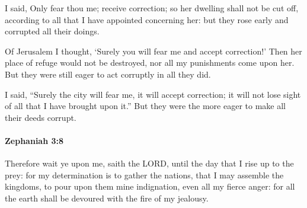 			\begin{versebox}
					\item[BHS] 
					\item[LXX] 
					\item[ASV] I said, Only fear thou me; receive correction; so her dwelling shall not be cut off, according to all that I have appointed concerning her: but they rose early and corrupted all their doings.
					\item[NIV] Of Jerusalem I thought, ‘Surely you will fear me and accept correction!’ Then her place of refuge would not be destroyed, nor all my punishments come upon her. But they were still eager to act corruptly in all they did.
					\item[NRSV] I said, “Surely the city will fear me, it will accept correction; it will not lose sight of all that I have brought upon it.” But they were the more eager to make all their deeds corrupt.
			\end{versebox}

		\paragraph{Zephaniah 3:8} %
			\label{ZEPHANIAH-3-8}

			Therefore wait ye upon me, saith the LORD, until the day that I rise up to the prey: for my determination is to gather the nations, that I may assemble the kingdoms, to pour upon them mine indignation, even all my fierce anger: for all the earth shall be devoured with the fire of my jealousy.

